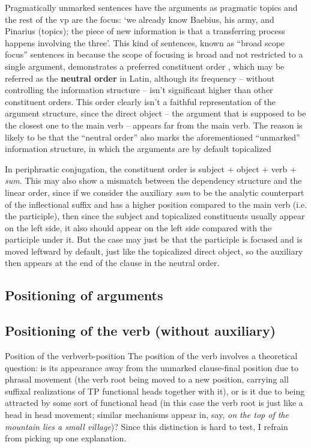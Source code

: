 \documentclass[a4paper, oneside, 12pt]{report}
\newcommand*{\citepage}[1]{p.~{#1}}
\newcommand*{\concept}[1]{\textbf{#1}}
\newcommand{\form}[1]{\emph{#1}}
\newcommand{\translate}[1]{`#1'}
\begin{document}
Pragmatically unmarked sentences have the arguments as pragmatic topics 
and the rest of the \acs{vp} are the focus:
\translate{we already know Baebius, his army, and Pinarius (topics);
the piece of new information is that 
a transferring process happens involving the three}.
This kind of sentences, known as ``broad scope focus'' sentences 
in \citet[\citepage{15}]{devine2006latin}
because the scope of focusing is broad
and not restricted to a single argument,
demonstrates a preferred constituent order 
\citep[\citepage{79}]{devine2006latin},
which may be referred as the \concept{neutral order} in Latin,
although its frequency -- without controlling the information structure -- 
isn't significant higher than other constituent orders.
This order clearly isn't a faithful representation 
of the argument structure, 
since the direct object -- the argument that is supposed to be the closest one to the main verb -- 
appears far from the main verb. 
The reason is likely to be that the ``neutral order'' also marks 
the aforementioned ``unmarked'' information structure, 
in which the arguments are by default topicalized 

In periphrastic conjugation,
the constituent order is subject + object + verb + \form{sum}.
This may also show a mismatch between the dependency structure and the linear order,
since if we consider the auxiliary \form{sum} to be 
the analytic counterpart of the inflectional suffix 
and has a higher position compared to the main verb (i.e. the participle),
then since the subject and topicalized constituents usually appear on the left side, 
it also should appear on the left side compared with the participle under it.
But the case may just be that the participle is focused and is moved leftward by default, 
just like the topicalized direct object,
so the auxiliary then appears at the end of the clause in the neutral order.

\subsection{Positioning of arguments}

\subsection{Positioning of the verb (without auxiliary)}

\begin{infobox}{Position of the verb}{verb-position}
    The position of the verb involves a theoretical question:
    is its appearance away from the unmarked clause-final position
    due to phrasal movement 
    (the verb root being moved to a new position, 
    carrying all suffixal realizations of 
    TP functional heads together with it),
    or is it due to being attracted by some sort of functional head
    (in this case the verb root is just like a head in head movement;
    similar mechanisms appear in, say, 
    \form{on the top of the mountain \emph{lies} a small village})?
    Since this distinction is hard to test, 
    I refrain from picking up one explanation.
\end{infobox}
\end{document}
